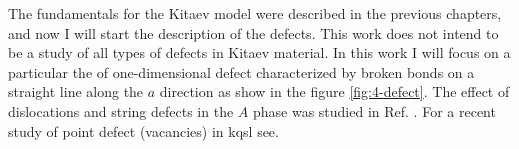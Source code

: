 \label{ch:4}

The fundamentals for the Kitaev model were described in the previous chapters, and now I will start the description of the defects. This work does not intend to be a study of all types of defects in Kitaev material. %
In this work I will focus on a particular the of one-dimensional defect characterized by broken bonds on a straight line along the $a$ direction as show in the figure \ref{fig:4-defect}.
The effect of dislocations and string defects in the $A$ phase was studied in Ref. \cite{Olga_2014}. %
For a recent study of point defect (vacancies) in \acrshort{kqsl} see\cite{kao2020vacancyinduced}. 

